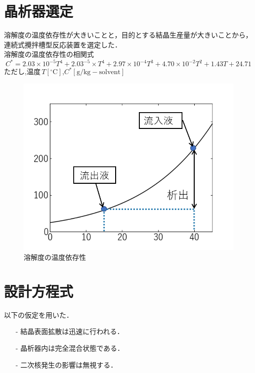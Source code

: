 \documentclass[a4j]{jsreport}
\begin{document}
\section{晶析器選定}
溶解度の温度依存性が大きいことと，目的とする結晶生産量が大きいことから，
連続式攪拌槽型反応装置を選定した．\\
溶解度の温度依存性の相関式
\begin{equation}
    C^*=2.03\times 10^{-5}T^4 +2.03^{-5}\times T^4 + 2.97\times 10^{-4}T^3 + 4.70\times 10^{-2}T^2
        + 1.43T + 24.71
\end{equation}
ただし,温度\,$T[\mathrm{^\circ C}]$,$C^*[\mathrm{g/kg-solvent}]$\\
\begin{figure}[h]
    \label{溶解度の温度依存性}
    \begin{center}
        \includegraphics[scale=0.7]{BzAsolvent.png}
        \caption{溶解度の温度依存性}
    \end{center}
\end{figure}


\section{設計方程式}
以下の仮定を用いた．
\begin{itemize}
    \setlength{\parskip}{0pt}
    \setlength{\itemsep}{2pt}
    \item[-] 結晶表面拡散は迅速に行われる．
    \item[-] 晶析器内は完全混合状態である．
    \item[-] 二次核発生の影響は無視する．
\end{itemize}
\end{document}
